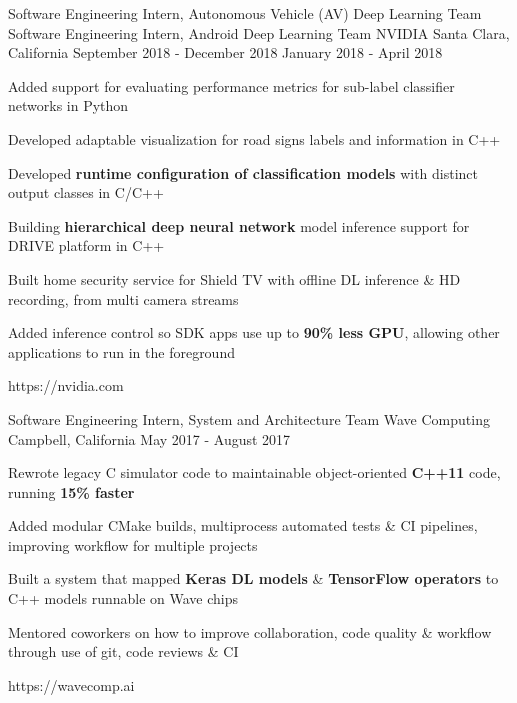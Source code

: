 \begin{cventries}
\cventrylink
{Software Engineering Intern, Autonomous Vehicle (AV) Deep Learning Team \newline {\vspace{-.75mm}}
    Software Engineering Intern, Android Deep Learning Team}
{NVIDIA}
{Santa Clara, California}
{September 2018 - December 2018 \newline {\vspace{-1mm}}
    January 2018 - April 2018}
{ %
\begin{cvitems}
\item{Added support for evaluating performance metrics for sub-label classifier networks in Python}
\item{Developed adaptable visualization for road signs labels and information in C++}
\item{Developed \textbf{runtime configuration of classification models} with distinct output classes in C/C++}
\item{Building \textbf{hierarchical deep neural network} model inference support for DRIVE platform in C++}
\item{Built home security service for Shield TV with offline DL inference \& HD recording, from multi camera streams}
\item{Added inference control so SDK apps use up to \textbf{90\% less GPU}, allowing other applications to run in the foreground}
\end{cvitems}
}
{https://nvidia.com}


\cventrylink
    {Software Engineering Intern, System and Architecture Team}
{Wave Computing}
{Campbell, California}
    {May 2017 - August 2017}
{ %
\begin{cvitems}
\item {Rewrote legacy C simulator code to maintainable object-oriented \textbf{C++11} code, running \textbf{15\% faster}}
\item {Added modular CMake builds, multiprocess automated tests \& CI pipelines, improving workflow for multiple projects}
\item {Built a system that mapped \textbf{Keras DL models} \& \textbf{TensorFlow operators} to C++ models runnable on Wave chips}
\item {Mentored coworkers on how to improve collaboration, code quality \& workflow through use of git, code reviews \& CI}
\end{cvitems}
}
{https://wavecomp.ai}


\end{cventries}
